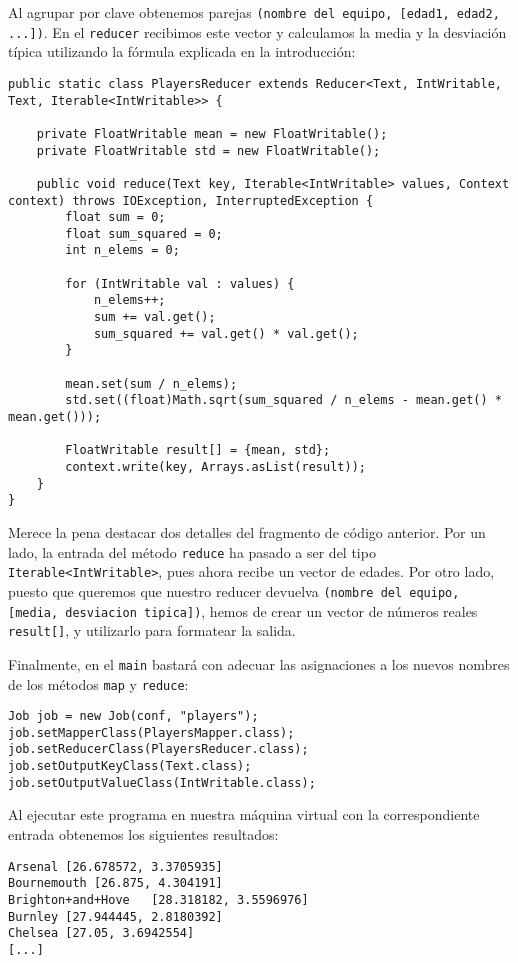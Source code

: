 \documentclass[11pt]{article}
\def\inline{\lstinline[basicstyle=\ttfamily,keywordstyle={}]}
\begin{document}
Al agrupar por clave obtenemos parejas \inline{(nombre del equipo, [edad1, edad2, ...])}. En el \inline{reducer} recibimos este vector y calculamos la media y la desviación típica utilizando la fórmula explicada en la introducción:

\begin{verbatim}
public static class PlayersReducer extends Reducer<Text, IntWritable, Text, Iterable<IntWritable>> {
	
	private FloatWritable mean = new FloatWritable();
	private FloatWritable std = new FloatWritable();
	
	public void reduce(Text key, Iterable<IntWritable> values, Context context) throws IOException, InterruptedException {
		float sum = 0;
		float sum_squared = 0;
		int n_elems = 0;
		
		for (IntWritable val : values) {
			n_elems++;
			sum += val.get();
			sum_squared += val.get() * val.get();
		}
		
		mean.set(sum / n_elems);
		std.set((float)Math.sqrt(sum_squared / n_elems - mean.get() * mean.get()));
		
		FloatWritable result[] = {mean, std};
		context.write(key, Arrays.asList(result));
	}
}
\end{verbatim}

Merece la pena destacar dos detalles del fragmento de código anterior. Por un lado, la entrada del método \inline{reduce} ha pasado a ser del tipo \inline{Iterable<IntWritable>}, pues ahora recibe un vector de edades. Por otro lado, puesto que queremos que nuestro reducer devuelva \inline{(nombre del equipo, [media, desviacion tipica])}, hemos de crear un vector de números reales \inline{result[]}, y utilizarlo para formatear la salida.

Finalmente, en el \inline{main} bastará con adecuar las asignaciones a los nuevos nombres de los métodos \inline{map} y \inline{reduce}:

\begin{verbatim}
Job job = new Job(conf, "players");
job.setMapperClass(PlayersMapper.class);
job.setReducerClass(PlayersReducer.class);
job.setOutputKeyClass(Text.class);
job.setOutputValueClass(IntWritable.class);
\end{verbatim}

Al ejecutar este programa en nuestra máquina virtual con la correspondiente entrada obtenemos los siguientes resultados:

\begin{verbatim}
Arsenal	[26.678572, 3.3705935]
Bournemouth	[26.875, 4.304191]
Brighton+and+Hove	[28.318182, 3.5596976]
Burnley	[27.944445, 2.8180392]
Chelsea	[27.05, 3.6942554]
[...]
\end{verbatim}
\end{document}
